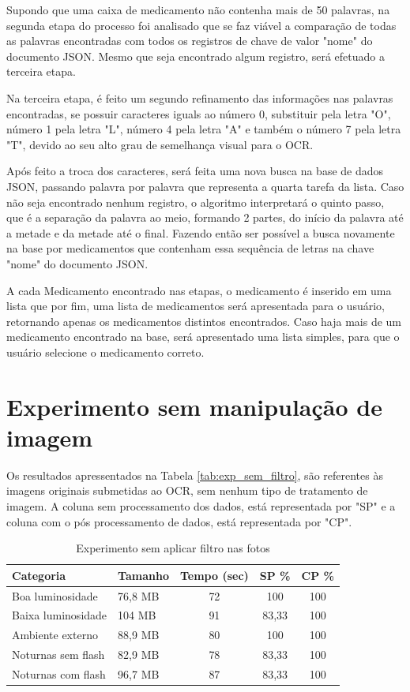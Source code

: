 Supondo que uma caixa de medicamento não contenha mais de 50 palavras, na segunda etapa do processo foi analisado que se faz viável a comparação de todas as palavras encontradas com todos os registros de chave de valor "nome" do documento JSON. Mesmo que seja encontrado algum registro, será efetuado a terceira etapa.

Na terceira etapa, é feito um segundo refinamento das informações nas palavras encontradas, se possuir caracteres iguals ao número 0, substituir pela letra "O", número 1 pela letra "L", número 4 pela letra "A" e também o número 7 pela letra "T", devido ao seu alto grau de semelhança visual para o OCR. 

Após feito a troca dos caracteres, será feita uma nova busca na base de dados JSON, passando palavra por palavra que representa a quarta tarefa da lista. Caso não seja encontrado nenhum registro, o algoritmo interpretará o quinto passo, que é a separação da palavra ao meio, formando 2 partes, do início da palavra até a metade e da metade até o final. Fazendo então ser possível a busca novamente na base por medicamentos que contenham essa sequência de letras na chave "nome" do documento JSON.

A cada Medicamento encontrado nas etapas, o medicamento é inserido em uma lista que por fim, uma lista de medicamentos será apresentada para o usuário, retornando apenas os medicamentos distintos encontrados. Caso haja mais de um medicamento encontrado na base, será apresentado uma lista simples, para que o usuário selecione o medicamento correto.


\section{Experimento sem manipulação de imagem}
Os resultados apressentados na Tabela \ref{tab:exp_sem_filtro}, são referentes às imagens originais submetidas ao OCR, sem nenhum tipo de tratamento de imagem. A coluna sem processamento dos dados, está representada por "SP" e a coluna com o pós processamento de dados, está representada por "CP".


\begin{table}[]
\caption{Experimento sem aplicar filtro nas fotos}
\label{tab:exp_sem_filtro}
\centering
\begin{tabular}{llccc}
\hline
Categoria          & Tamanho    & Tempo (sec) & SP \%  & CP \% \\ \hline
Boa luminosidade   & 76,8 MB & 72     & 100 & 100         \\
Baixa luminosidade & 104 MB & 91     & 83,33 & 100         \\
Ambiente externo   & 88,9 MB & 80     & 100 & 100         \\
Noturnas sem flash & 82,9 MB & 78     & 83,33& 100         \\
Noturnas com flash & 96,7 MB & 87     & 83,33 & 100         \\ \hline
\end{tabular}
	\label{fig:exp_sem_filtro}
\end{table}

